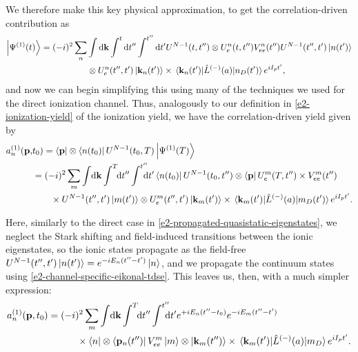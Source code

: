 We therefore make this key physical approximation, to get the correlation-driven contribution as
\begin{align}
\ket{\Psi^{(1)}(t)}
=(-i)^2\sum_n  & \int\d\vb{k}\int^t\d t''\int^{t''}\d t'U^{N-1}(t,t'') \otimes U_e^n(t,t'')V_{ee}^n(t'') U^{N-1}(t'',t')\ket{n(t')}
\nonumber \\ & \otimes 
U_e^n(t'',t')\ket{\vb{k}_n(t')}\times\matrixel{\vb{k}_n(t')}{\hat{L}^{(-)}(a)}{n_D(t')}e^{iI_p t'},
\label{e2-abstract-correlation-state-approximate}
\end{align}
and now we can begin simplifying this using many of the techniques we used for the direct ionization channel. Thus, analogously to our definition in \eqref{e2-ionization-yield} of the ionization yield, we have the correlation-driven yield given by
\begin{align}
a_n^{(1)}(\vb{p},& \tn)
=
\bra{\vb{p}}\otimes\bra{n(\tn)}U^{N-1}(\tn,T)\ket{\Psi^{(1)}(T)}
\nonumber \\ & =
(-i)^2\sum_m  \int\!\d\vb{k}\int^T\!\!\d t''\int^{t''}\!\!\!\!\d t'
\bra{n(\tn)}U^{N-1}(\tn,t'') \otimes \bra{\vb{p}}U_e^m(T,t'')
\times V_{ee}^m(t'') 
\nonumber \\ & \quad \quad \times
U^{N-1}(t'',t')\ket{m(t')}
\otimes 
U_e^m(t'',t')\ket{\vb{k}_m(t')}
\times\matrixel{\vb{k}_m(t')}{\hat{L}^{(-)}(a)}{m_D(t')}e^{iI_p t'}.
\label{e2-correlation-driven-yield-initial}
\end{align}

Here, similarly to the direct case in \eqref{e2-propagated-quasistatic-eigenstates}, we neglect the Stark shifting and field-induced transitions between the ionic eigenstates, so the ionic states propagate as the field-free $U^{N-1}(t'',t')\ket{n(t')}=e^{-iE_n(t''-t')}\ket{n}$, and we propagate the continuum states using \eqref{e2-channel-specific-eikonal-tdse}. This leaves us, then, with a much simpler expression:
\begin{align}
a_n^{(1)}(\vb{p},\tn)
& =
(-i)^2\sum_m  \int\!\d\vb{k}\int^T\!\!\d t''\int^{t''}\!\!\!\!\d t'
e^{+iE_n(t''-\tn)}
e^{-iE_m(t''-t')}
\nonumber \\ & \qquad \quad
\times
\bra{n} \otimes \bra{\vb{p}_n(t'')}
V_{ee}^m
\ket{m}
\otimes 
\ket{\vb{k}_m(t'')}
\times\matrixel{\vb{k}_m(t')}{\hat{L}^{(-)}(a)}{m_D}e^{iI_p t'}.
\label{e2-correlation-driven-yield-second}
\end{align}

